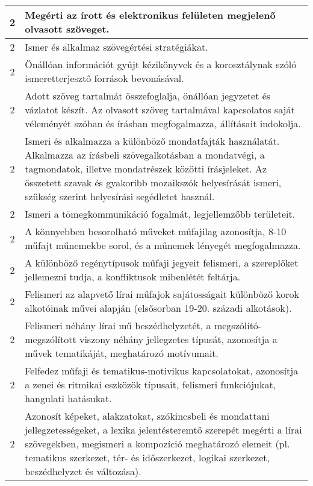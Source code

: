 \begin{longtable}{c | p{} }
                                          2 &  Megérti az írott és elektronikus felületen megjelenő olvasott szöveget. \\ \hline
                                          2 &  Ismer és alkalmaz szövegértési stratégiákat. \\ \hline
                                          2 &  Önállóan információt gyűjt kézikönyvek és a korosztálynak szóló ismeretterjesztő források bevonásával. \\ \hline
                                          2 &  Adott szöveg tartalmát összefoglalja, önállóan jegyzetet és vázlatot készít. Az olvasott szöveg tartalmával kapcsolatos saját véleményét szóban és írásban megfogalmazza, állításait indokolja. \\ \hline
                                          2 &  Ismeri és alkalmazza a különböző mondatfajták használatát. Alkalmazza az írásbeli szövegalkotásban a mondatvégi, a tagmondatok, illetve mondatrészek közötti írásjeleket. Az összetett szavak és gyakoribb mozaikszók helyesírását ismeri, szükség szerint helyesírási segédletet használ. \\ \hline
                                          2 &  Ismeri a tömegkommunikáció fogalmát, legjellemzőbb területeit. \\ \hline
                                          2 &  A könnyebben besorolható műveket műfajilag azonosítja, 8-10 műfajt műnemekbe sorol, és a műnemek lényegét megfogalmazza. \\ \hline
                                          2 &  A különböző regénytípusok műfaji jegyeit felismeri, a szereplőket jellemezni tudja, a konfliktusok mibenlétét feltárja. \\ \hline
                                          2 &  Felismeri az alapvető lírai műfajok sajátosságait különböző korok alkotóinak művei alapján (elsősorban 19-20. századi alkotások). \\ \hline
                                          2 &  Felismeri néhány lírai mű beszédhelyzetét, a megszólító-megszólított viszony néhány jellegzetes típusát, azonosítja a művek tematikáját, meghatározó motívumait. \\ \hline
                                          2 &  Felfedez műfaji és tematikus-motivikus kapcsolatokat, azonosítja a zenei és ritmikai eszközök típusait, felismeri funkciójukat, hangulati hatásukat. \\ \hline
                                          2 &  Azonosít képeket, alakzatokat, szókincsbeli és mondattani jellegzetességeket, a lexika jelentésteremtő szerepét megérti a lírai szövegekben, megismeri a kompozíció meghatározó elemeit (pl. tematikus szerkezet, tér- és időszerkezet, logikai szerkezet, beszédhelyzet és változása). \\ \hline

\end{longtable}
